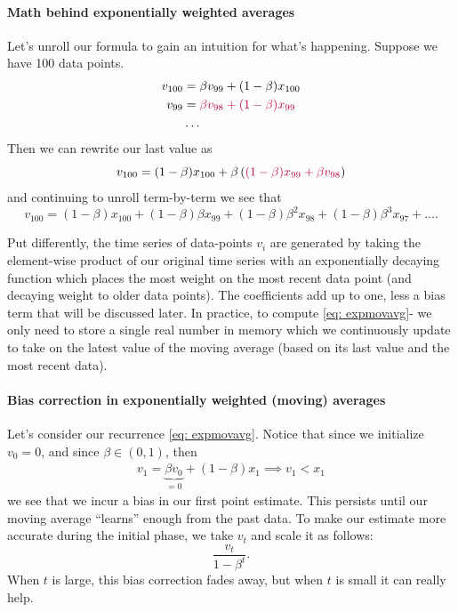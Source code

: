 \documentclass[12pt]{article}
\begin{document}
\paragraph{Math behind exponentially weighted averages} Let's unroll our formula to 
gain an intuition for what's happening. Suppose we have 100 data points.
\begin{align*}   v_{100} &= \beta v_{99} + (1-\beta) x_{100} \\
  v_{99}  &= \color{purple} \beta v_{98} + (1-\beta) x_{99} \\ 
  &\ldots \end{align*}
Then we can rewrite our last value as 
\[
  v_{100} = (1-\beta) x_{100} + \beta \left( \color{purple} (1-\beta) x_{99} + \beta v_{98} \color{black} \right) 
\]
and continuing to unroll term-by-term we see that
\[
  v_{100} = (1-\beta) x_{100} + (1-\beta) \beta x_{99} + (1-\beta) \beta^2 x_{98} + (1-\beta) \beta^3 x_{97} + \ldots.
\]

Put differently, the time series of data-points $v_i$ are generated by taking the element-wise product of our original time series with an exponentially decaying function which places the most weight on the most recent data point (and decaying weight to older data points). The coefficients add up to one, less a bias term that will be discussed later. In practice, to compute \ref{eq: expmovavg}- we only need to store a single real number in memory which we continuously update to take on the latest value of 
the moving average (based on its last value and the most recent data).

\paragraph{Bias correction in exponentially weighted (moving) averages} Let's consider our recurrence \ref{eq: expmovavg}. Notice that since we initialize $v_0 = 0$, and since $\beta \in (0,1)$, then
\begin{align*}   v_1 = \underbrace{\beta v_0}_{=0} + (1-\beta) x_1 \implies v_1 < x_1
\end{align*}
we see that we incur a bias in our first point estimate. This persists until our moving average ``learns'' enough from the past data. To make our estimate more accurate during the initial phase, we take $v_t$ and scale it as follows:
\[
  \frac{v_t}{1 - \beta^t}.
\]
When $t$ is large, this bias correction fades away, but when $t$ is small it can really help.
\end{document}
